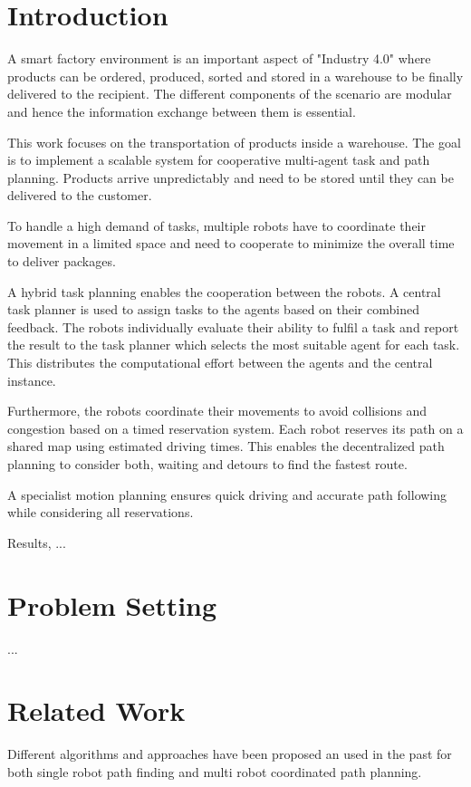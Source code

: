 \documentclass[journal]{IEEEtran}
\begin{document}
\section{Introduction}
\label{sec:introduction}
A smart factory environment is an important aspect of "Industry 4.0" where products can be ordered, produced, sorted and stored in a warehouse to be finally delivered to the recipient. The different components of the scenario are modular and hence the information exchange between them is essential.

This work focuses on the transportation of products inside a warehouse. The goal is to implement a scalable system for cooperative multi-agent task and path planning. Products arrive unpredictably and need to be stored until they can be delivered to the customer.

To handle a high demand of tasks, multiple robots have to coordinate their movement in a limited space and need to cooperate to minimize the overall time to deliver packages.

A hybrid task planning enables the cooperation between the robots. A central task planner is used to assign tasks to the agents based on their combined feedback. The robots individually evaluate their ability to fulfil a task and report the result to the task planner which selects the most suitable agent for each task. This distributes the computational effort between the agents and the central instance.

Furthermore, the robots coordinate their movements to avoid collisions and congestion based on a timed reservation system. Each robot reserves its path on a shared map using estimated driving times. This enables the decentralized path planning to consider both, waiting and detours to find the fastest route.

A specialist motion planning ensures quick driving and accurate path following while considering all reservations.

Results, ...

\section{Problem Setting}
\label{sec:problem_setting}
...


\section{Related Work}
\label{sec:related_work}
Different algorithms and approaches have been proposed an used in the past for both single robot path finding and multi robot coordinated path planning. 
\end{document}
